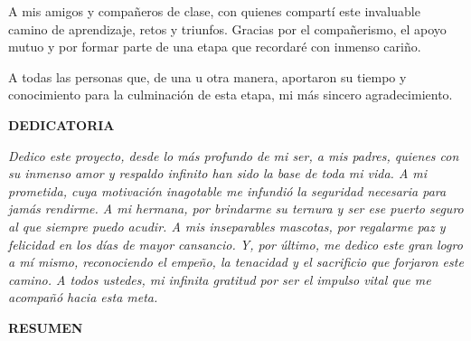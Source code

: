 \documentclass[12pt,a4paper,oneside]{report}
\begin{document}
A mis amigos y compañeros de clase, con quienes compartí este invaluable camino de aprendizaje, retos y triunfos. Gracias por el compañerismo, el apoyo mutuo y por formar parte de una etapa que recordaré con inmenso cariño.

A todas las personas que, de una u otra manera, aportaron su tiempo y conocimiento para la culminación de esta etapa, mi más sincero agradecimiento.

\newpage

\begin{center}
    \vspace*{0.5cm}
    {\bfseries DEDICATORIA}
\end{center}
\vspace{1.5cm}

\begin{flushright}
    \begin{minipage}{0.65\textwidth}
        \itshape
        \justifying
        Dedico este proyecto, desde lo más profundo de mi ser, a mis padres, quienes con su inmenso amor y respaldo infinito han sido la base de toda mi vida. A mi prometida, cuya motivación inagotable me infundió la seguridad necesaria para jamás rendirme. A mi hermana, por brindarme su ternura y ser ese puerto seguro al que siempre puedo acudir. A mis inseparables mascotas, por regalarme paz y felicidad en los días de mayor cansancio. Y, por último, me dedico este gran logro a mí mismo, reconociendo el empeño, la tenacidad y el sacrificio que forjaron este camino. A todos ustedes, mi infinita gratitud por ser el impulso vital que me acompañó hacia esta meta.
    \end{minipage}
\end{flushright}

\newpage

\begin{center}
    \vspace*{0.5cm}
    {\bfseries RESUMEN}
\end{center}
\vspace{0.8cm}
\end{document}
